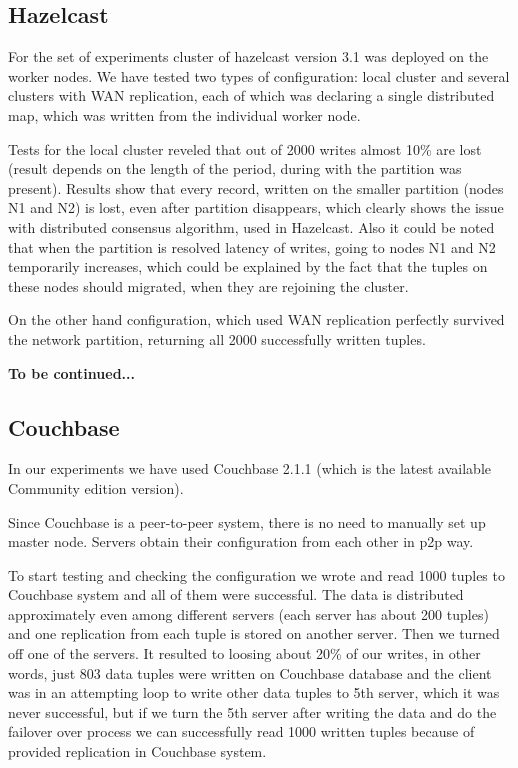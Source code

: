 \documentclass[a4paper]{article}
\begin{document}
\subsection{Hazelcast}

For the set of experiments cluster of hazelcast version 3.1 was deployed on the worker nodes. 
We have tested two types of configuration: local cluster and several clusters with WAN replication, each of which was declaring a single distributed map, which was written from the individual worker node.

Tests for the local cluster reveled that out of 2000 writes almost 10\% are lost (result depends on the length of the period, during with the partition was present).
Results show that every record, written on the smaller partition (nodes N1 and N2) is lost, even after partition disappears, which clearly shows the issue with distributed consensus algorithm, used in Hazelcast.
Also it could be noted that when the partition is resolved latency of writes, going to nodes N1 and N2 temporarily increases, which could be explained by the fact that the tuples on these nodes should migrated, when they are rejoining the cluster.

On the other hand configuration, which used WAN replication perfectly survived the network partition, returning all 2000 successfully written tuples.

{\bf To be continued...}

\subsection{Couchbase}

In our experiments we have used Couchbase 2.1.1 (which is the latest available Community edition version).

Since Couchbase is a peer-to-peer system, there is no need to manually set up master node. Servers obtain their configuration from each other in p2p way.

To start testing and checking the configuration we wrote and read 1000 tuples to Couchbase system and all of them were successful. 
The data is distributed approximately even among different servers (each server has about 200 tuples) and one replication from each tuple is stored on another server. 
Then we turned off one of the servers. It resulted to loosing about 20\% of our writes, in other words, just 803 data tuples were written on Couchbase database and the client was in an attempting loop to write other data tuples to 5th server, which it was never successful, but if we turn the 5th server after writing the data and do the failover over process we can successfully read 1000 written tuples because of provided replication in Couchbase system.
\end{document}
